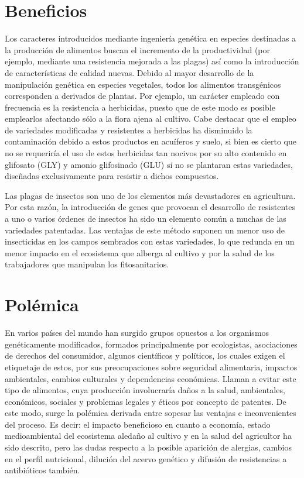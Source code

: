 \documentclass[11pt,twoside]{article}
\begin{document}
\section{Beneficios}



Los caracteres introducidos mediante ingeniería genética en especies destinadas a la producción de alimentos buscan el incremento de la productividad (por ejemplo, mediante una resistencia mejorada a las plagas) así como la introducción de características de calidad nuevas. Debido al mayor desarrollo de la manipulación genética en especies vegetales, todos los alimentos transgénicos corresponden a derivados de plantas. Por ejemplo, un carácter empleado con frecuencia es la resistencia a herbicidas, puesto que de este modo es posible emplearlos afectando sólo a la flora ajena al cultivo. Cabe destacar que el empleo de variedades modificadas y resistentes a herbicidas ha disminuido la contaminación debido a estos productos en acuíferos y suelo, si bien es cierto que no se requeriría el uso de estos herbicidas tan nocivos por su alto contenido en glifosato (GLY) y amonio glifosinado (GLU) si no se plantaran estas variedades, diseñadas exclusivamente para resistir a dichos compuestos.


Las plagas de insectos son uno de los elementos más devastadores en agricultura.
Por esta razón, la introducción de genes que provocan el desarrollo de resistentes a uno o varios órdenes de insectos ha sido un elemento común a muchas de las variedades patentadas. Las ventajas de este método suponen un menor uso de insecticidas en los campos sembrados con estas variedades, lo que redunda en un menor impacto en el ecosistema que alberga al cultivo y por la salud de los trabajadores que manipulan los fitosanitarios.





\section{Polémica}





En varios países del mundo han surgido grupos opuestos a los organismos genéticamente modificados, formados principalmente por ecologistas, asociaciones de derechos del consumidor, algunos científicos y políticos, los cuales exigen el etiquetaje de estos, por sus preocupaciones sobre seguridad alimentaria, impactos ambientales, cambios culturales y dependencias económicas. Llaman a evitar este tipo de alimentos, cuya producción involucraría daños a la salud, ambientales, económicos, sociales y problemas legales y éticos por concepto de patentes.
De este modo, surge la polémica derivada entre sopesar las ventajas e inconvenientes del proceso. Es decir: el impacto beneficioso en cuanto a economía, estado medioambiental del ecosistema aledaño al cultivo y en la salud del agricultor ha sido descrito, pero las dudas respecto a la posible aparición de alergias, cambios en el perfil nutricional, dilución del acervo genético y difusión de resistencias a antibióticos también.
\end{document}
